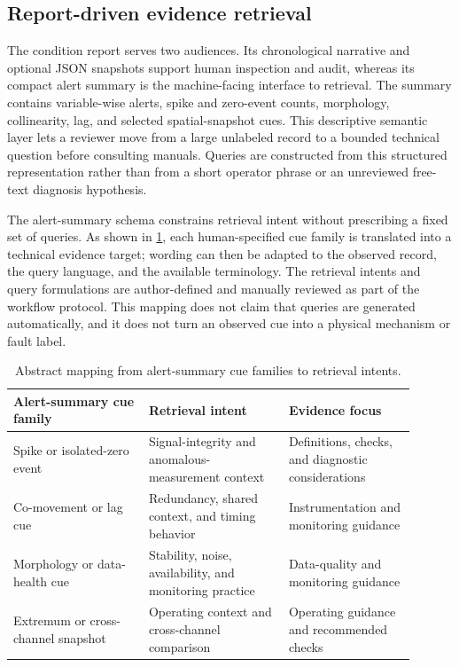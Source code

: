 \subsection{Report-driven evidence retrieval}
\label{sec:rag-diag}

The condition report serves two audiences. Its chronological narrative and optional JSON snapshots support human inspection and audit, whereas its compact alert summary is the machine-facing interface to retrieval. The summary contains variable-wise alerts, spike and zero-event counts, morphology, collinearity, lag, and selected spatial-snapshot cues. This descriptive semantic layer lets a reviewer move from a large unlabeled record to a bounded technical question before consulting manuals. Queries are constructed from this structured representation rather than from a short operator phrase or an unreviewed free-text diagnosis hypothesis.

The alert-summary schema constrains retrieval intent without prescribing a fixed set of queries. As shown in \cref{tab:alert-query-intents}, each human-specified cue family is translated into a technical evidence target; wording can then be adapted to the observed record, the query language, and the available terminology. The retrieval intents and query formulations are author-defined and manually reviewed as part of the workflow protocol. This mapping does not claim that queries are generated automatically, and it does not turn an observed cue into a physical mechanism or fault label.

\begin{table}[H]
  \centering
  \footnotesize
  \setlength{\tabcolsep}{3pt}
  \caption{Abstract mapping from alert-summary cue families to retrieval intents.}
  \label{tab:alert-query-intents}
  \begin{tabular}{@{}>{\raggedright\arraybackslash}p{0.30\linewidth}
                    >{\raggedright\arraybackslash}p{0.31\linewidth}
                    >{\raggedright\arraybackslash}p{0.29\linewidth}@{}}
    \toprule
    Alert-summary cue family & Retrieval intent & Evidence focus \\
    \midrule
    Spike or isolated-zero event & Signal-integrity and anomalous-measurement context & Definitions, checks, and diagnostic considerations \\
    Co-movement or lag cue & Redundancy, shared context, and timing behavior & Instrumentation and monitoring guidance \\
    Morphology or data-health cue & Stability, noise, availability, and monitoring practice & Data-quality and monitoring guidance \\
    Extremum or cross-channel snapshot & Operating context and cross-channel comparison & Operating guidance and recommended checks \\
    \bottomrule
  \end{tabular}
\end{table}

